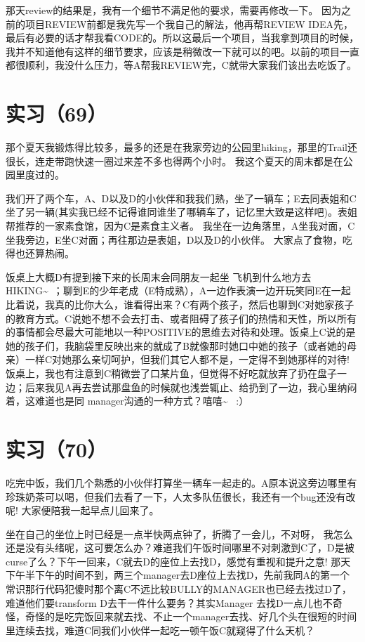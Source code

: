\documentclass[12pt]{book}
\begin{document}
那天review的结果是，我有一个细节不满足他的要求，需要再修改一下。 因为之前的项目REVIEW前都是我先写一个我自己的解法，他再帮REVIEW IDEA先，最后有必要的话才帮我看CODE的。所以这最后一个项目，当我拿到项目的时候，我并不知道他有这样的细节要求，应该是稍微改一下就可以的吧。以前的项目一直都很顺利，我没什么压力，等A帮我REVIEW完，C就带大家我们该出去吃饭了。 


\section{实习（69）　}
\label{sec-5-72}

那个夏天我锻炼得比较多，最多的还是在我家旁边的公园里hiking，那里的Trail还很长，连走带跑快速一圈过来差不多也得两个小时。 我这个夏天的周末都是在公园里度过的。 

我们开了两个车，A、D以及D的小伙伴和我我们熟，坐了一辆车；E去同表姐和C坐了另一辆(其实我已经不记得谁同谁坐了哪辆车了，记忆里大致是这样吧)。表姐帮推荐的一家素食馆，因为C是素食主义者。 我坐在一边角落里，A坐我对面，C坐我旁边，E坐C对面；再往那边是表姐，D以及D的小伙伴。 大家点了食物，吃得也还算热闹。

饭桌上大概D有提到接下来的长周末会同朋友一起坐 飞机到什么地方去HIKING\textasciitilde{}~；聊到E的少年老成（E特成熟），A一边作表演一边开玩笑同E在一起比着说，我真的比你大么，谁看得出来？C有两个孩子，然后也聊到C对她家孩子的教育方式。C说她不想不会去打击、或者阻碍了孩子们的热情和天性，所以所有的事情都会尽最大可能地以一种POSITIVE的思维去对待和处理。饭桌上C说的是她的孩子们，我脑袋里反映出来的就成了B就像那时她口中她的孩子（或者她的母亲）一样C对她那么亲切呵护，但我们其它人都不是，一定得不到她那样的对待!  饭桌上，我也有注意到C稍微尝了口某片鱼，但觉得不好吃就放弃了扔在盘子一边；后来我见A再去尝试那盘鱼的时候就也浅尝辄止、给扔到了一边，我心里纳闷着，这难道也是同 manager沟通的一种方式？嘻嘻\textasciitilde{}~ :）


\section{实习（70）　}
\label{sec-5-73}

吃完中饭，我们几个熟悉的小伙伴打算坐一辆车一起走的。A原本说这旁边哪里有珍珠奶茶可以喝，但我们去看了一下，人太多队伍很长，我还有一个bug还没有改呢! 大家便陪我一起早点儿回来了。

坐在自己的坐位上时已经是一点半快两点钟了，折腾了一会儿，不对呀， 我怎么还是没有头绪呢，这可要怎么办？难道我们午饭时间哪里不对刺激到C了，D是被curse了么？下午一回来，C就去D的座位上去找D，感觉有重视和提升之意!  那天下午半下午的时间不到，两三个manager去D座位上去找D，先前我同A的第一个常识那行代码犯傻时那个离C不远比较BULLY的MANAGER也已经去找过D了，难道他们要transform D去干一件什么要务？其实Manager 去找D一点儿也不奇怪，奇怪的是吃完饭回来就去找、不止一个manager去找、好几个头在很短的时间里连续去找，难道C同我们小伙伴一起吃一顿午饭C就窥得了什么天机？
\end{document}
